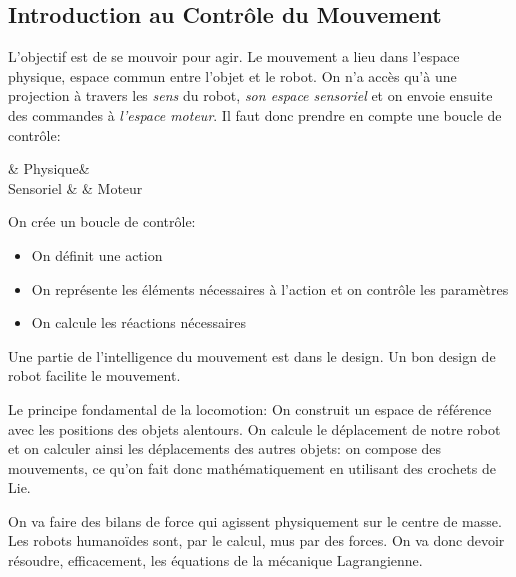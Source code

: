 \documentclass[math]{cours}
\begin{document}
\subsection{Introduction au Contrôle du Mouvement}
L'objectif est de se mouvoir pour agir.
Le mouvement a lieu dans l'espace physique, espace commun entre l'objet et le robot.
On n'a accès qu'à une projection à travers les \textit{sens} du robot, \emph{son espace sensoriel} et on envoie ensuite des commandes à \emph{l'espace moteur}.
Il faut donc prendre en compte une boucle de contrôle:
\begin{category}[]
	& Physique & \\
	Sensoriel  & & Moteur
\end{category}

On crée un boucle de contrôle:
\begin{itemize}
	\item On définit une action
	\item On représente les éléments nécessaires à l'action et on contrôle les paramètres
	\item On calcule les réactions nécessaires
\end{itemize}
Une partie de l'intelligence du mouvement est dans le design.
Un bon design de robot facilite le mouvement.

Le principe fondamental de la locomotion:
On construit un espace de référence avec les positions des objets alentours.
On calcule le déplacement de notre robot et on calculer ainsi les déplacements des autres objets:
on compose des mouvements, ce qu'on fait donc mathématiquement en utilisant des crochets de Lie.

On va faire des bilans de force qui agissent physiquement sur le centre de masse.
Les robots humanoïdes sont, par le calcul, mus par des forces.
On va donc devoir résoudre, efficacement, les équations de la mécanique Lagrangienne.
\end{document}
